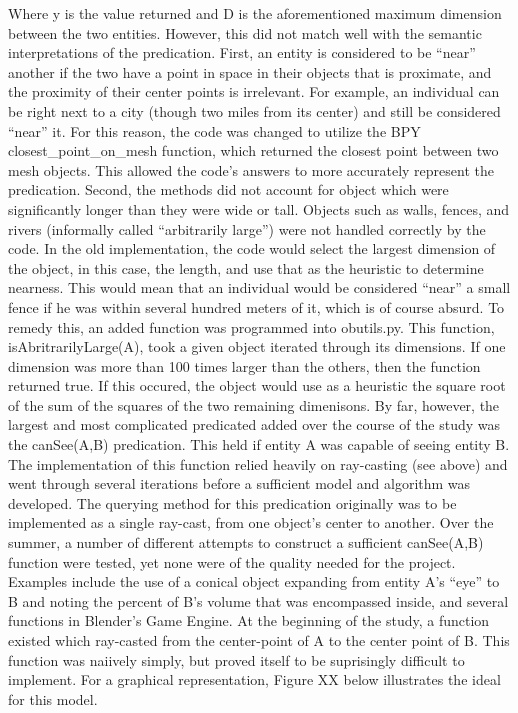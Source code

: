 Where y is the value returned and D is the aforementioned maximum dimension between the two entities. However, this did not match well with the semantic interpretations of the predication.
First, an entity is considered to be “near” another if the two have a point in space in their objects that is proximate, and the proximity of their center points is irrelevant. For example, an individual can be right next to a city (though two miles from its center) and still be considered “near” it. For this reason, the code was changed to utilize the BPY closest\_point\_on\_mesh function, which returned the closest point between two mesh objects. This allowed the code's answers to more accurately represent the predication.
Second, the methods did not account for object which were significantly longer than they were wide or tall. Objects such as walls, fences, and rivers (informally called “arbitrarily large”) were not handled correctly by the code. In the old implementation, the code would select the largest dimension of the object, in this case, the length, and use that as the heuristic to determine nearness. This would mean that an individual would be considered “near” a small fence if he was within several hundred meters of it, which is of course absurd. 
To remedy this, an added function was programmed into obutils.py. This function, isAbritrarilyLarge(A), took a given object iterated through its dimensions. If one dimension was more than 100 times larger than the others, then the function returned true. If this occured, the object would use as a heuristic the square root of the sum of the squares of the two remaining dimenisons.
By far, however, the largest and most complicated predicated added over the course of the study was the canSee(A,B) predication. This held if entity A was capable of seeing entity B. The implementation of this function relied heavily on ray-casting (see above) and went through several iterations before a sufficient model and algorithm was developed. 
The querying method for this predication originally was to be implemented as a single ray-cast, from one object's center to another. Over the summer, a number of different attempts to construct a sufficient canSee(A,B) function were tested, yet none were of the quality needed for the project. Examples include the use of a conical object expanding from entity A's “eye” to B and noting the percent of B's volume that was encompassed inside, and several functions in Blender's Game Engine. At the beginning of the study, a function existed which ray-casted from the center-point of A to the center point of B. This function was naiively simply, but proved itself to be suprisingly difficult to implement. For a graphical representation, Figure XX below illustrates the ideal for this model.

